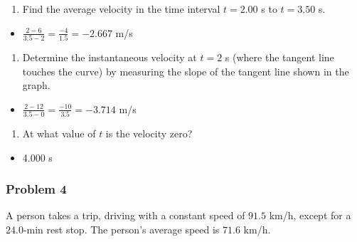 \documentclass[
  letterpaper,
  DIV=11,
  numbers=noendperiod]{scrartcl}
\providecommand{\tightlist}{%
  \setlength{\itemsep}{0pt}\setlength{\parskip}{0pt}}\usepackage{longtable,booktabs,array}
\begin{document}
\begin{enumerate}
\def\labelenumi{(\alph{enumi})}
\tightlist
\item
  Find the average velocity in the time interval \(t = 2.00\) s to
  \(t = 3.50\) s.
\end{enumerate}

\begin{itemize}
\tightlist
\item
  \(\frac{2-6}{3.5-2}=\frac{-4}{1.5}=-2.667\) m/s
\end{itemize}

\begin{enumerate}
\def\labelenumi{(\alph{enumi})}
\setcounter{enumi}{1}
\tightlist
\item
  Determine the instantaneous velocity at \(t = 2\) s (where the tangent
  line touches the curve) by measuring the slope of the tangent line
  shown in the graph.
\end{enumerate}

\begin{itemize}
\tightlist
\item
  \(\frac{2-12}{3.5-0} = \frac{-10}{3.5} = -3.714\) m/s
\end{itemize}

\begin{enumerate}
\def\labelenumi{(\alph{enumi})}
\setcounter{enumi}{2}
\tightlist
\item
  At what value of \(t\) is the velocity zero?
\end{enumerate}

\begin{itemize}
\tightlist
\item
  4.000 s
\end{itemize}

\newpage{}

\hypertarget{problem-4}{%
\subsubsection{Problem 4}\label{problem-4}}

A person takes a trip, driving with a constant speed of \(91.5\) km/h,
except for a \(24.0\)-min rest stop. The person's average speed is
\(71.6\) km/h.
\end{document}
